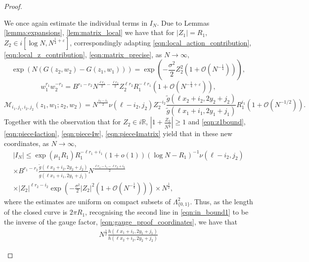 \documentclass[11pt]{article}
\theoremstyle{plain}
\theoremstyle{definition}
\numberwithin{equation}{section}
\newcommand{\Ordo}{\mathcal{O}}
\begin{document}
\begin{proof}
\begin{enumerate}
%
We once again estimate the individual terms in $I_N$.
%
%
Due to Lemmas \ref{lemma:expansions}, \ref{lem:matrix_local} we have that for $|Z_1|=R_1$, $Z_2\in i[\log N, N^{\frac{1}{4}+\varepsilon}]$, correspondingly adapting \eqref{eqn:local_action_contribution}, \eqref{eqn:local_z_contribution}, \eqref{eqn:matrix_precise}, as $N\rightarrow\infty$,
\begin{equation}\label{eqn:piece4action}
\exp(N(G(z_2,w_2)-G(z_1,w_1)))=\exp\left(-\frac{\sigma^2}{2}Z_2^2(1+\mathcal{O}(N^{-\frac{1}{4}}))\right),
\end{equation}
\begin{equation}\label{eqn:piece4w}
w_1^{r_1}w_2^{-r_2}=
B^{r_1-r_2}
N^{\frac{\ell r_1}{2}-\frac{\ell r_2}{2}}
 {Z_2^{\ell r_2}}{R_1^{-\ell r_1}}\left(1+\mathcal{O}(N^{-\frac{1}{4}+\varepsilon})\right),
\end{equation}
\begin{equation}\label{eqn:piece4matrix}
\boldsymbol{\mathcal{M}}_{i_1,j_1,i_2,j_2}\left(z_1,w_1;z_2,w_2\right)
%
= 
{N^{\frac{i_2-i_1}{2}}}
\nu(\ell-i_2,j_2){Z_2^{-i_2}}
\frac{\tilde g(\ell x_2+i_2,2y_2+j_2)}{\tilde g(\ell x_1+i_1,2y_1+j_1)}
{R_1^{i_1}}
\left(1+\Ordo\left(N^{-1/2}\right)\right).
\end{equation}
Together with the observation that for $Z_2\in i\mathbb{R}$, $\left|1+\frac{Z_2}{N^{\frac{1}{2}}}\right|\geq 1$ and  \eqref{eqn:z1bound}, \eqref{eqn:piece4action}, \eqref{eqn:piece4w}, \eqref{eqn:piece4matrix} yield that in these new coordinates, as $N\rightarrow\infty$,
%
\begin{multline} \label{eqn:in_bound1}
|I_N|
\leq \exp(\mu_1 R_1) R_1^{-\ell r_1+i_1}(1+o(1))(\log N-R_1)^{-1}
\nu(\ell-i_2,j_2)
\\\times
B^{r_1-r_2} 
\frac{\tilde g(\ell x_2+i_2,2y_2+j_2)}{\tilde g(\ell x_1+i_1,2y_1+j_1)}
N^{\frac{\ell r_1 -i_1-\ell r_2+i_2}{2}} 
\\\times|Z_2|^{\ell r_2-i_2}
\exp\left(-\frac{\sigma^2}{2}|Z_2|^2(1+\mathcal{O}(N^{-\frac{1}{4}}))\right) \times N^{\frac{1}{2}},
\end{multline}
where the estimates are uniform on compact subsets of $\Lambda_{\{0,1\}}^2$. Thus, as the length of the closed curve is $2\pi R_1$, 
%
%
%
recognising the second line in \eqref{eqn:in_bound1} to be the inverse of the gauge factor, \eqref{eqn:gauge_proof_coordinates}, we have that
\begin{multline}\label{eqn:cut_piece_2}
N^{\frac{1}{2}}
\frac{h(\ell x_1+i_1,2y_1+j_1)}{h(\ell x_2+i_2,2y_2+j_2)}

\end{multline}
\end{enumerate}
\end{proof}
\end{document}

